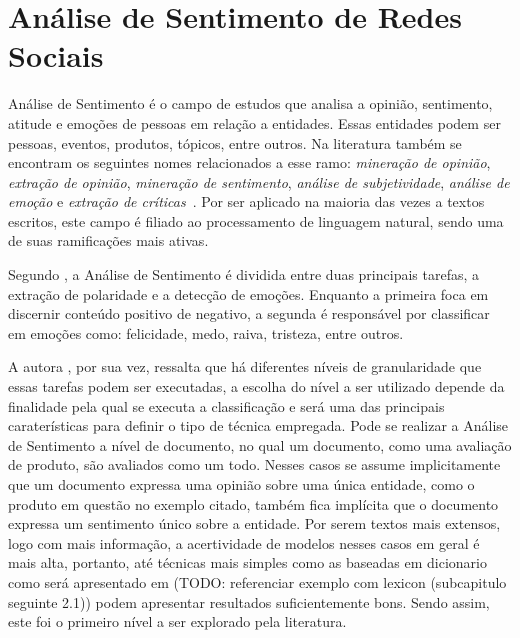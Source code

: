 \chapter{Análise de Sentimento de Redes Sociais}
\label{chapter:sentiment}

Análise de Sentimento é o campo de estudos que analisa a opinião, sentimento,
atitude e emoções de pessoas em relação a entidades.
Essas entidades podem ser pessoas, eventos, produtos, tópicos, entre outros.
Na literatura também se encontram os seguintes nomes relacionados a esse ramo:
\textit{mineração de opinião}, \textit{extração de opinião},
\textit{mineração de sentimento}, \textit{análise de subjetividade},
\textit{análise de emoção} e \textit{extração de críticas}~\cite{liu15}.
Por ser aplicado na maioria das vezes a textos escritos, este campo é filiado
ao processamento de linguagem natural, sendo uma de suas ramificações mais
ativas.

Segundo \citet{cambria16}, a Análise de Sentimento é dividida entre duas
principais tarefas, a extração de polaridade e a detecção de emoções.
Enquanto a primeira foca em discernir conteúdo positivo de negativo, a segunda é
responsável por classificar em emoções como: felicidade, medo, raiva, tristeza,
entre outros.

A autora \citet{liu15}, por sua vez, ressalta que há diferentes níveis de
granularidade que essas tarefas podem ser executadas, a escolha do nível a ser
utilizado depende da finalidade pela qual se executa a classificação e será uma
das principais caraterísticas para definir o tipo de técnica empregada.
Pode se realizar a Análise de Sentimento a nível de documento, no qual um
documento, como uma avaliação de produto, são avaliados como um todo.
Nesses casos se assume implicitamente que um documento expressa uma opinião
sobre uma única entidade, como o produto em questão no exemplo citado, também
fica implícita que o documento expressa um sentimento único sobre a entidade.
Por serem textos mais extensos, logo com mais informação, a acertividade de
modelos nesses casos em geral é mais alta, portanto, até técnicas mais simples
como as baseadas em dicionario como será apresentado em (TODO: referenciar exemplo com lexicon
(subcapitulo seguinte 2.1)) podem apresentar resultados suficientemente bons.
Sendo assim, este foi o primeiro nível a ser explorado pela literatura.

